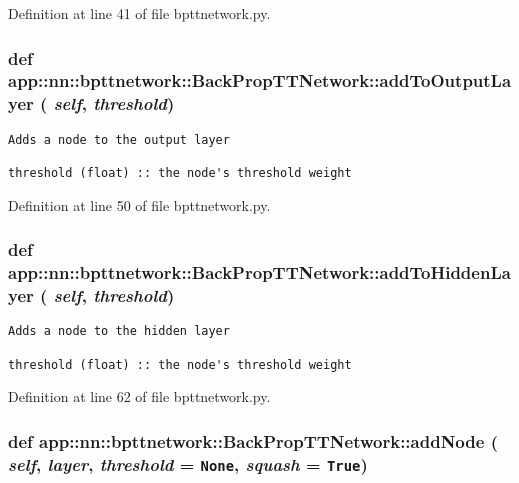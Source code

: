 Definition at line 41 of file bpttnetwork.py.
\subsubsection{\setlength{\rightskip}{0pt plus 5cm}def app::nn::bpttnetwork::BackPropTTNetwork::addToOutputLayer ( {\em self},  {\em threshold})}\label{classapp_1_1nn_1_1bpttnetwork_1_1BackPropTTNetwork_203911b49bbbe474e4e83d0a33bdffcb}




\footnotesize\begin{verbatim}Adds a node to the output layer

threshold (float) :: the node's threshold weight
\end{verbatim}
\normalsize
 

Definition at line 50 of file bpttnetwork.py.
\subsubsection{\setlength{\rightskip}{0pt plus 5cm}def app::nn::bpttnetwork::BackPropTTNetwork::addToHiddenLayer ( {\em self},  {\em threshold})}\label{classapp_1_1nn_1_1bpttnetwork_1_1BackPropTTNetwork_b214e6ad6c1f90b1d4671f110a838209}




\footnotesize\begin{verbatim}Adds a node to the hidden layer

threshold (float) :: the node's threshold weight
\end{verbatim}
\normalsize
 

Definition at line 62 of file bpttnetwork.py.
\subsubsection{\setlength{\rightskip}{0pt plus 5cm}def app::nn::bpttnetwork::BackPropTTNetwork::addNode ( {\em self},  {\em layer},  {\em threshold} = {\tt None},  {\em squash} = {\tt True})}\label{classapp_1_1nn_1_1bpttnetwork_1_1BackPropTTNetwork_d89c46cb401db8e7dd421f2f84d71857}





